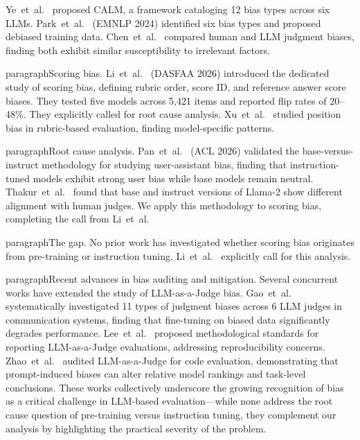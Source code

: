 \documentclass[11pt,twocolumn]{article}
\begin{document}
Ye~et~al.~\cite{ye2024justice} proposed CALM, a framework cataloging 12 bias types across six LLMs. Park~et~al.~\cite{park2024offsetbias} (EMNLP 2024) identified six bias types and proposed debiased training data. Chen~et~al.~\cite{chen2024humans} compared human and LLM judgment biases, finding both exhibit similar susceptibility to irrelevant factors.

paragraph{Scoring bias.}
Li~et~al.~\cite{li2025scoring} (DASFAA 2026) introduced the dedicated study of scoring bias, defining rubric order, score ID, and reference answer score biases. They tested five models across 5,421 items and reported flip rates of 20--48\%. They explicitly called for root cause analysis. Xu~et~al.~\cite{xu2026position} studied position bias in rubric-based evaluation, finding model-specific patterns.

paragraph{Root cause analysis.}
Pan~et~al.~\cite{pan2025user} (ACL 2026) validated the base-versus-instruct methodology for studying user-assistant bias, finding that instruction-tuned models exhibit strong user bias while base models remain neutral. Thakur~et~al.~\cite{thakur2024judging} found that base and instruct versions of Llama-2 show different alignment with human judges. We apply this methodology to scoring bias, completing the call from Li~et~al.

paragraph{The gap.}
No prior work has investigated whether scoring bias originates from pre-training or instruction tuning. Li~et~al.~\cite{li2025scoring} explicitly call for this analysis.

paragraph{Recent advances in bias auditing and mitigation.}
Several concurrent works have extended the study of LLM-as-a-Judge bias. Gao~et~al.~\cite{gao2025evaluating} systematically investigated 11 types of judgment biases across 6 LLM judges in communication systems, finding that fine-tuning on biased data significantly degrades performance. Lee~et~al.~\cite{lee2025correctly} proposed methodological standards for reporting LLM-as-a-Judge evaluations, addressing reproducibility concerns. Zhao~et~al.~\cite{zhao2026bias} audited LLM-as-a-Judge for code evaluation, demonstrating that prompt-induced biases can alter relative model rankings and task-level conclusions. These works collectively underscore the growing recognition of bias as a critical challenge in LLM-based evaluation---while none address the root cause question of pre-training versus instruction tuning, they complement our analysis by highlighting the practical severity of the problem.
\end{document}
